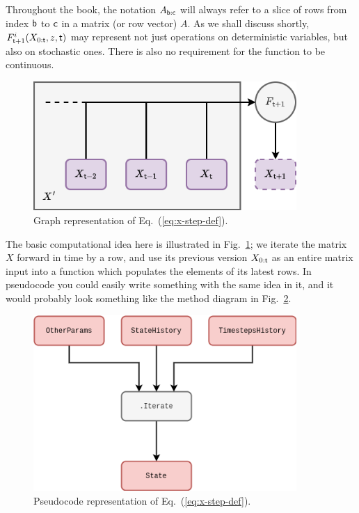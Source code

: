 Throughout the book, the notation $A_{{{\sf b}:{\sf c}}}$ will always refer to a slice of rows from index ${\sf b}$ to ${\sf c}$ in a matrix (or row vector) $A$. As we shall discuss shortly, $F^i_{{\sf t}+1}(X_{0:{\sf t}},z,{\sf t})$ may represent not just operations on deterministic variables, but also on stochastic ones. There is also no requirement for the function to be continuous.

\begin{figure}[h]
\centering
\includegraphics[width=10cm]{images/chapter-1-fundamental-loop.drawio.png}
\caption{Graph representation of Eq.~(\ref{eq:x-step-def}).}
\label{fig:fundamental-loop}
\end{figure}

The basic computational idea here is illustrated in Fig.~\ref{fig:fundamental-loop}; we iterate the matrix $X$ forward in time by a row, and use its previous version $X_{0:{\sf t}}$ as an entire matrix input into a function which populates the elements of its latest rows. In pseudocode you could easily write something with the same idea in it, and it would probably look something like the method diagram in Fig.~\ref{fig:fundamental-loop-code}.

\begin{figure}[h]
\centering
\includegraphics[width=10cm]{images/chapter-1-fundamental-loop-code.drawio.png}
\caption{Pseudocode representation of Eq.~(\ref{eq:x-step-def}).}
\label{fig:fundamental-loop-code}
\end{figure}


